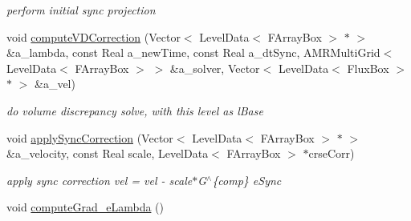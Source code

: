 \begin{DoxyCompactItemize}
\begin{DoxyCompactList}\small\item\em perform initial sync projection \end{DoxyCompactList}\item 
\hypertarget{class_c_c_projector_comp_aa0ee6b5313dc4132154974dbee6824e3}{void \hyperlink{class_c_c_projector_comp_aa0ee6b5313dc4132154974dbee6824e3}{compute\-V\-D\-Correction} (Vector$<$ Level\-Data$<$ F\-Array\-Box $>$ $\ast$ $>$ \&a\-\_\-lambda, const Real a\-\_\-new\-Time, const Real a\-\_\-dt\-Sync, A\-M\-R\-Multi\-Grid$<$ Level\-Data$<$ F\-Array\-Box $>$ $>$ \&a\-\_\-solver, Vector$<$ Level\-Data$<$ Flux\-Box $>$ $\ast$ $>$ \&a\-\_\-vel)}\label{class_c_c_projector_comp_aa0ee6b5313dc4132154974dbee6824e3}

\begin{DoxyCompactList}\small\item\em do volume discrepancy solve, with this level as l\-Base \end{DoxyCompactList}\item 
void \hyperlink{class_c_c_projector_comp_a11615c1c93a1c57e69841aa0a53a8d56}{apply\-Sync\-Correction} (Vector$<$ Level\-Data$<$ F\-Array\-Box $>$ $\ast$ $>$ \&a\-\_\-velocity, const Real scale, Level\-Data$<$ F\-Array\-Box $>$ $\ast$crse\-Corr)
\begin{DoxyCompactList}\small\item\em apply sync correction vel = vel -\/ scale$\ast$\-G$^\wedge$\{comp\} e\-Sync \end{DoxyCompactList}\item 
\hypertarget{class_c_c_projector_comp_a78cdda769e7e22827284b2ca8d8793d0}{void \hyperlink{class_c_c_projector_comp_a78cdda769e7e22827284b2ca8d8793d0}{compute\-Grad\-\_\-e\-Lambda} ()}\label{class_c_c_projector_comp_a78cdda769e7e22827284b2ca8d8793d0}


\end{DoxyCompactItemize}

